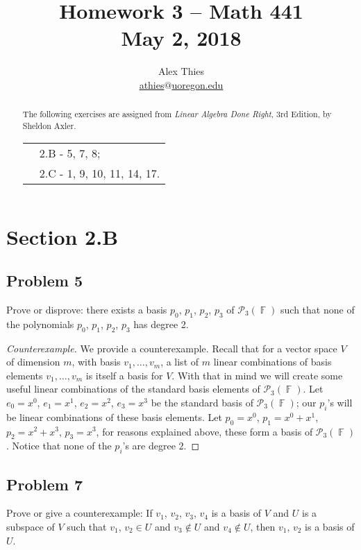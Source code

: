 \documentclass[letterpaper, 12pt]{amsart}
\DeclareMathOperator{\F}{\mathbb{F}}				%
\theoremstyle{definition}  							%
\begin{document}
	\title{Homework 3  -- Math 441 \\ M\lowercase{ay 2, 2018}}
	\author{Alex Thies \\ \href{mailto:athies@uoregon.edu}{\lowercase{athies$@$uoregon.edu}}}

	\begin{abstract}
	The following exercises are assigned from \textit{Linear Algebra Done Right}, 3rd Edition, by Sheldon Axler. 
			\begin{tabular}{rl}
				& 2.B - 5, 7, 8; \\
				& 2.C - 1, 9, 10, 11, 14, 17.
			\end{tabular}
	\end{abstract}
	
	\maketitle

	\section*{Section 2.B}
		\subsection*{Problem 5}
		Prove or disprove: there exists a basis $p_{0}$, $p_{1}$, $p_{2}$, $p_{3}$ of $\mathcal{P}_{3}(\F)$ such that none of the polynomials $p_{0}$, $p_{1}$, $p_{2}$, $p_{3}$ has degree 2.

		\begin{proof}[Counterexample]
		We provide a counterexample.
		Recall that for a vector space $V$ of dimension $m$, with basis $v_{1}, \dots, v_{m}$, a list of $m$ linear combinations of basis elements $v_{1}, \dots, v_{m}$ is itself a basis for $V$.
		With that in mind we will create some useful linear combinations of the standard basis elements of $\mathcal{P}_{3}(\F)$.
		Let $e_{0} = x^{0}$, $e_{1} = x^{1}$, $e_{2} = x^{2}$, $e_{3} = x^{3}$ be the standard basis of $\mathcal{P}_{3}(\F)$; our $p_{i}$'s will be linear combinations of these basis elements.
		Let $p_{0} = x^{0}$, $p_{1} = x^{0} + x^{1}$, $p_{2} = x^{2} + x^{3}$, $p_{3} = x^{3}$, for reasons explained above, these form a basis of $\mathcal{P}_{3}(\F)$.
		Notice that none of the $p_{i}$'s are degree 2.
		\end{proof}

		\subsection*{Problem 7}
		Prove or give a counterexample: If $v_{1}$, $v_{2}$, $v_{3}$, $v_{4}$ is a basis of $V$ and $U$ is a subspace of $V$ such that $v_{1}$, $v_{2} \in U$ and $v_{3} \notin U$ and $v_{4} \notin U$, then $v_{1}$, $v_{2}$ is a basis of $U$.
\end{document}
